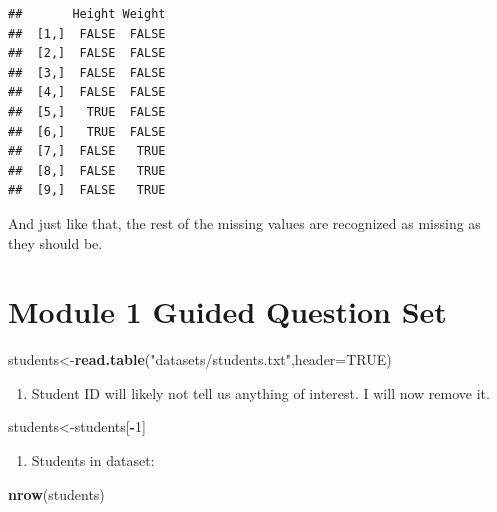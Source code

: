 \documentclass[
  openany]{book}
\newenvironment{Shaded}{\begin{snugshade}}{\end{snugshade}}
\newcommand{\AttributeTok}[1]{\textcolor[rgb]{0.13,0.29,0.53}{#1}}
\newcommand{\ConstantTok}[1]{\textcolor[rgb]{0.56,0.35,0.01}{#1}}
\newcommand{\DecValTok}[1]{\textcolor[rgb]{0.00,0.00,0.81}{#1}}
\newcommand{\FunctionTok}[1]{\textcolor[rgb]{0.13,0.29,0.53}{\textbf{#1}}}
\newcommand{\NormalTok}[1]{#1}
\newcommand{\OtherTok}[1]{\textcolor[rgb]{0.56,0.35,0.01}{#1}}
\newcommand{\SpecialCharTok}[1]{\textcolor[rgb]{0.81,0.36,0.00}{\textbf{#1}}}
\newcommand{\StringTok}[1]{\textcolor[rgb]{0.31,0.60,0.02}{#1}}
\providecommand{\tightlist}{%
  \setlength{\itemsep}{0pt}\setlength{\parskip}{0pt}}
\begin{document}
\begin{verbatim}
##       Height Weight
##  [1,]  FALSE  FALSE
##  [2,]  FALSE  FALSE
##  [3,]  FALSE  FALSE
##  [4,]  FALSE  FALSE
##  [5,]   TRUE  FALSE
##  [6,]   TRUE  FALSE
##  [7,]  FALSE   TRUE
##  [8,]  FALSE   TRUE
##  [9,]  FALSE   TRUE
\end{verbatim}

And just like that, the rest of the missing values are recognized as missing as they should be.

\section*{Module 1 Guided Question Set}\label{module-1-guided-question-set}

\begin{Shaded}
\begin{Highlighting}[]
\NormalTok{students}\OtherTok{\textless{}{-}}\FunctionTok{read.table}\NormalTok{(}\StringTok{"datasets/students.txt"}\NormalTok{,}\AttributeTok{header=}\ConstantTok{TRUE}\NormalTok{)}
\end{Highlighting}
\end{Shaded}

\begin{enumerate}
\def\labelenumi{\arabic{enumi}.}
\tightlist
\item
  Student ID will likely not tell us anything of interest. I will now remove it.
\end{enumerate}

\begin{Shaded}
\begin{Highlighting}[]
\NormalTok{students}\OtherTok{\textless{}{-}}\NormalTok{students[}\SpecialCharTok{{-}}\DecValTok{1}\NormalTok{]}
\end{Highlighting}
\end{Shaded}

\begin{enumerate}
\def\labelenumi{\arabic{enumi}.}
\setcounter{enumi}{1}
\tightlist
\item
  Students in dataset:
\end{enumerate}

\begin{Shaded}
\begin{Highlighting}[]
\FunctionTok{nrow}\NormalTok{(students)}
\end{Highlighting}
\end{Shaded}
\end{document}
